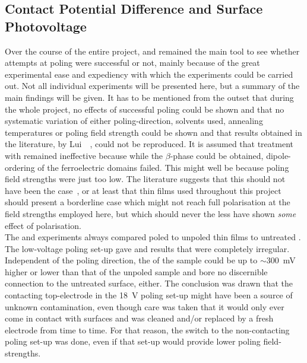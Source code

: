 \subsection{Contact Potential Difference and Surface Photovoltage}
Over the course of the entire project, \cpd{} and \spv{} remained the main tool to see whether attempts at poling \pvdf{} were successful or not, mainly because of the great experimental ease and expediency with which the experiments could be carried out. Not all individual experiments will be presented here, but a summary of the main findings will be given. It has to be mentioned from the outset that during the whole project, no effects of successful poling could be shown and that no systematic variation of either poling-direction, solvents used, annealing temperatures or poling field strength could be shown and that results obtained in the literature, \eg{} by Lui~\etal{}~\cite{liu_THEpaper}, could not be reproduced. It is assumed that treatment with \pvdf{} remained ineffective because while the $\beta$-phase could be obtained, dipole-ordering of the ferroelectric domains failed. This might well be because poling field strengths were just too low.  The literature suggests that this should not have been the case~\cite{ducharme_finitesize}, or at least that \pvdf{} thin films used throughout this project should present a borderline case which might not reach full polarisation at the field strengths employed here, but which should never the less have shown \emph{some} effect of polarisation.\\
The \cpd{} and \spv{} experiments always compared poled to unpoled \pvdf{} thin films to untreated \sih{}. The low-voltage poling set-up gave \cpd{} and \spv{} results that were completely irregular. Independent of the poling direction, the \cpd{} of the  sample could be up to $\sim$\SI{300}{\milli\volt} higher or lower than that of the unpoled sample and bore no discernible connection to the untreated \sih{} surface, either. The conclusion was drawn that the contacting top-electrode in the \SI{18}{\volt} poling set-up might have been a source of unknown contamination, even though care was taken that it would only ever come in contact with  \pvdf{} surfaces and was cleaned and/or replaced by a fresh electrode from time to time. For that reason, the switch to the non-contacting poling set-up was done, even if that set-up would provide lower poling field-strengths.\\
